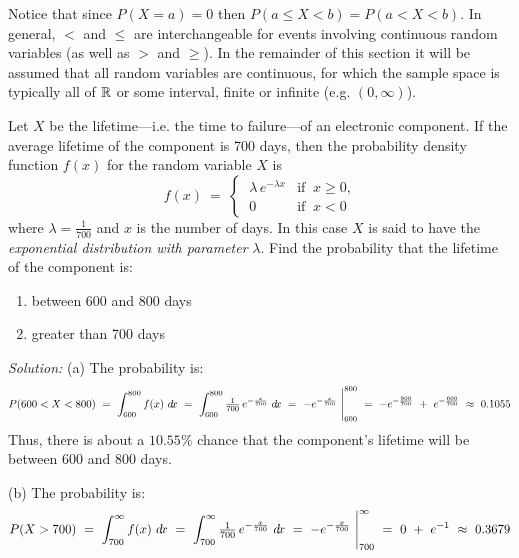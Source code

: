 Notice that since $P(X=a)=0$ then $P(a \le X < b) = P(a < X < b)$. In general,
$<$ and $\le$ are interchangeable for events involving continuous random
variables (as well as $>$ and $\ge$). In the remainder of this section it will
be assumed that all random variables are continuous, for which the sample space
is typically all of $\mathbb{R}$ or some interval, finite or infinite
(e.g. $(0,\infty)$).
\newpage
\begin{exmp}\label{exmp:expdist}
\noindent Let $X$ be the lifetime---i.e. the time to failure---of an electronic
component. If the average lifetime of the  component is 700 days, then the
probability density function $f(x)$ for the random variable $X$
is
\begin{equation}\label{eqn:expdist}
f(x) ~=~ \begin{cases} ~\lambda\,e^{-\lambda x}& \text{if $~x \ge 0$,}\\~0 & \text{if $~x<0$}\end{cases}
\end{equation}
where $\lambda = \frac{1}{700}$ and $x$ is the number of days. In this case $X$
is said to have the \emph{exponential distribution with parameter} $\lambda$.
Find the probability that the lifetime of the component is:
\begin{enumerate}[\bfseries (a)]
\item between 600 and 800 days
\item greater than 700 days
\end{enumerate}
\par\noindent\emph{Solution:} (a) The probability is:
\[
P(600 < X < 800) ~=~ \int_{600}^{800} f(x)~d\!x ~=~ \int_{600}^{800} \tfrac{1}{700}\,e^{-\frac{x}{700}}~d\!x
~=~ -e^{-\frac{x}{700}}~\Biggr|_{600}^{800} ~=~ -e^{-\frac{800}{700}} ~+~ e^{-\frac{600}{700}} ~\approx~ 0.1055
\]
Thus, there is about a $10.55\%$ chance that the component's lifetime will be
between 600 and 800 days.
\par\noindent (b) The probability is:
\[
P(X > 700) ~=~ \int_{700}^{\infty} f(x)~d\!x ~=~ \int_{700}^{\infty} \tfrac{1}{700}\,e^{-\frac{x}{700}}~d\!x
~=~ -e^{-\frac{x}{700}}~\Biggr|_{700}^{\infty} ~=~ 0 ~+~ e^{-1} ~\approx~ 0.3679
\]
\end{exmp}
\divider
\vspace{2mm}

